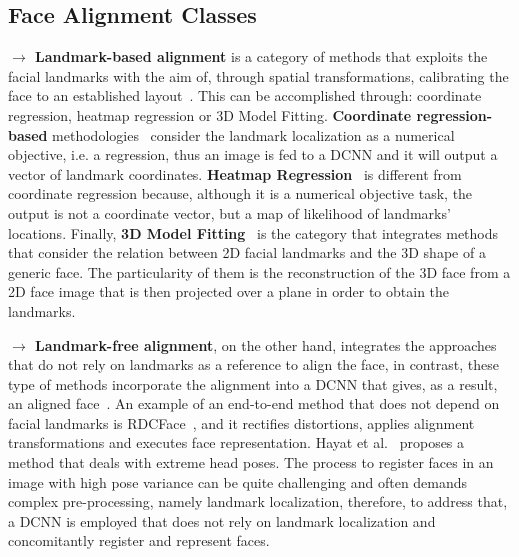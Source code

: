 \documentclass[class=report, crop=false, a4paper, 12pt]{standalone}
\begin{document}
\begin{appendix}



\chapter{Face Alignment Classes}\label{appendix:face_alignment_appendix}
\noindent\textbf{$\rightarrow$ Landmark-based alignment} is a category of methods that exploits the facial landmarks with the aim of, through spatial transformations, calibrating the face to an established layout~\autocite{duElementsEndtoendDeep2022}. This can be accomplished through: coordinate regression, heatmap regression or 3D Model Fitting. \textbf{Coordinate regression-based} methodologies~\autocite{fengWingLossRobust2018,liuTwoStreamTransformerNetworks2018,zhangJointFaceDetection2016a} consider the landmark localization as a numerical objective, i.e. a regression, thus an image is fed to a DCNN and it will output a vector of landmark coordinates. \textbf{Heatmap Regression}~\autocite{dengJointMultiviewFace2017,wuLookBoundaryBoundaryAware2018,chenFaceAlignmentKernel2019} is different from coordinate regression because, although it is a numerical objective task, the output is not a coordinate vector, but a map of likelihood of landmarks' locations. Finally, \textbf{3D Model Fitting}~\autocite{bhagavatulaFasterRealtimeFacial2017,changFacePoseNetMakingCase2017,xiaoRecurrent3D2DDual2017} is the category that integrates methods that consider the relation between 2D facial landmarks and the 3D shape of a generic face. The particularity of them is the reconstruction of the 3D face from a 2D face image that is then projected over a plane in order to obtain the landmarks. 

\vspace{0.7\baselineskip}
\noindent\textbf{$\rightarrow$ Landmark-free alignment}, on the other hand, integrates the approaches that do not rely on landmarks as a reference to align the face, in contrast, these type of methods incorporate the alignment into a DCNN that gives, as a result, an aligned face~\autocite{duElementsEndtoendDeep2022}. An example of an end-to-end method that does not depend on facial landmarks is RDCFace~\autocite{zhaoRDCFaceRadialDistortion2020}, and it rectifies distortions, applies alignment transformations and executes face representation. Hayat et al.~\autocite{hayatJointRegistrationRepresentation2017} proposes a method that deals with extreme head poses. The process to register faces in an image with high pose variance can be quite challenging and often demands complex pre-processing, namely landmark localization, therefore, to address that, a DCNN is employed that does not rely on landmark localization and concomitantly register and represent faces.


\end{appendix}
\end{document}
